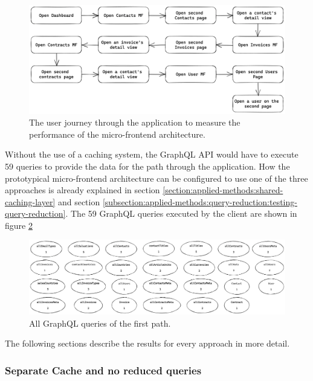 \ifshowImages
\begin{figure}[H]
\centering
\includegraphics[width=1\linewidth]{images/results/evaluation-path.png}
\caption{The user journey through the application to measure the performance of the micro-frontend architecture.}\label{fig:results:evaluation-path}
\end{figure}
\fi

\noindent Without the use of a caching system, the GraphQL \ac{API} would have to execute 59 queries to provide the data for the path through the application. How the prototypical micro-frontend architecture can be configured to use one of the three approaches is already explained in section \ref{section:applied-methods:shared-caching-layer} and section \ref{subsection:applied-methods:query-reduction:testing-query-reduction}. The 59 GraphQL queries executed by the client are shown in figure \ref{fig:results:graphql-queries}

\ifshowImages
\begin{figure}[H]
\centering
\includegraphics[width=1\linewidth]{images/results/graphql-queries.png}
\caption{All GraphQL queries of the first path.}\label{fig:results:graphql-queries}
\end{figure}
\fi

\noindent The following sections describe the results for every approach in more detail.

\subsubsection{Separate Cache and no reduced queries}\label{subsubsection:results:performance-measurement:separate-cache-no-reduction}

